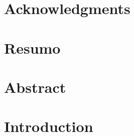 \documentclass[11pt,a4paper,twoside]{book} %
\begin{document}
	
	\listoftodos
	\newpage
	
	\thispagestyle{empty}
	
	
	\newpage
	
	\newpage
	\thispagestyle{plain}
	\mbox{}
	
	
	
	\newpage
	\thispagestyle{plain}
	\mbox{}
	
	\newpage
	\thispagestyle{empty}
	

	\cleardoublepage
	
	\chapter*{Acknowledgments}
	
	
	\newpage
	\thispagestyle{plain}
	\mbox{}
	
	
	\chapter*{Resumo}
	
	
	\newpage
	\thispagestyle{plain}
	\mbox{}
	
	\chapter*{Abstract}
	
	
	\newpage
	\thispagestyle{plain}
	\mbox{}
		
	
	\tableofcontents{}
	
	
	\listoffigures
	\listoftables

\cleardoublepage
	

	
	\chapter{Introduction}
        
		\mbox{}
\end{document}
